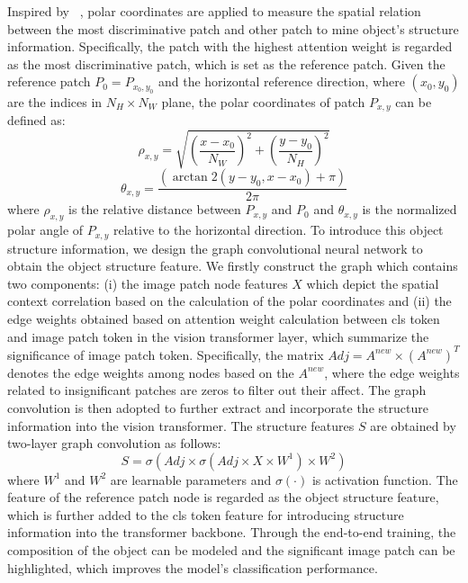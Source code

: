 \documentclass[sigconf, nonacm]{acmart}
\begin{document}
Inspired by ~\cite{zhou2020look}, polar coordinates are applied to measure the spatial relation between the most discriminative patch and other patch to mine object’s structure information. Specifically, the patch with the highest attention weight is regarded as the most discriminative patch, which is set as the reference patch. Given the reference patch ${P_0} = {P_{{x_0},{y_0}}}$ and the horizontal reference direction, where $({x_0},{y_0})$ are the indices in ${N_H} \times {N_W}$ plane, the polar coordinates of patch ${P_{x,y}}$ can be defined as:
\begin{equation}
{\rho _{x,y}} = \sqrt {{{(\frac{{x - {x_0}}}{{{N_W}}})}^2} + {{(\frac{{y - {y_0}}}{{{N_H}}})}^2}} 
\end{equation}
\begin{equation}
{\theta _{x,y}} = \frac{{(\arctan 2(y - {y_0},x - {x_0}) + \pi )}}{{2\pi }}
\end{equation}
where ${\rho _{x,y}}$ is the relative distance between ${P_{x,y}}$ and ${P_0 }$ and $\theta _{x,y}$ is the normalized polar angle of ${P_{x,y}}$ relative to the horizontal direction. To introduce this object structure information, we design the graph convolutional neural network to obtain the object structure feature. We firstly construct the graph which contains two components: (i) the image patch node features $X$ which depict the spatial context correlation based on the calculation of the polar coordinates and (ii) the edge weights obtained based on attention weight calculation between cls token and image patch token in the vision transformer layer, which summarize the significance of image patch token. Specifically, the matrix $Adj = A_{}^{new} \times {(A_{}^{new})^T}$ denotes the edge weights among nodes based on the ${A^{new}}$, where the edge weights related to insignificant patches are zeros to filter out their affect. The graph convolution is then adopted to further extract and incorporate the structure information into the vision transformer. The structure features $S$ are obtained by two-layer graph convolution as follows:
\begin{equation}
S = \sigma (Adj \times \sigma (Adj \times X \times {W^1}) \times {W^2})
\end{equation}
where ${W^1}$ and ${W^2}$ are learnable parameters and $\sigma ( \cdot )$ is activation function. The feature of the reference patch node is regarded as the object structure feature, which is further added to the cls token feature for introducing structure information into the transformer backbone. Through the end-to-end training, the composition of the object can be modeled and the significant image patch can be highlighted, which improves the model’s classification performance.
\end{document}
